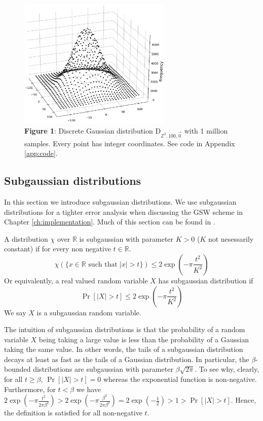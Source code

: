 \begin{figure}
    \centering
    \hypertarget{fig:discrete-gauss}{}
    \includegraphics[width=0.65\textwidth]{figures/D-G-2d-a_is_100-n_1000000.pdf}
    \caption*{\textbf{Figure 1}: Discrete Gaussian distribution $\textrm{D}_{\mathbb{Z}^2, 100, \vec{0}}$ with 1 million samples. Every point has integer coordinates. See code in Appendix \ref{app:code}.}
\end{figure}

\subsection*{Subgaussian distributions}
In this section we introduce subgaussian distributions. We use subgaussian distributions for a tighter error analysis when discussing the GSW scheme in Chapter \ref{ch:implementation}. Much of this section can be found in \cite{A-S-P-boot}.
\begin{definition}
    A distribution $\chi$ over $\mathbb{R}$ is subgaussian with parameter $K > 0$ ($K$ not nesessarily constant) if for every non negative $t \in \mathbb{R}$.
    \begin{equation*}
        \chi(\{x \in \mathbb{R} \text{ such that} \; |x| > t\}) \leq 2\exp \left(- \pi \frac{t^2}{K^2} \right)
    \end{equation*}
    Or equivalently, a real valued random variable $X$ has subgaussian distribution if
    \begin{equation*}
        \operatorname{Pr}[|X|>t] \leq 2\exp \left(- \pi \frac{t^2}{K^2} \right)
    \end{equation*}
    We say $X$ is a subgaussian random variable.
\end{definition}
The intuition of subgaussian distributions is that the probability of a random variable $X$ being taking a large value is less than the probability of a Gaussian taking the same value. In other words, the tails of a subgaussian distribution decays at least as fast as the tails of a Gaussian distribution. In particular, the $\beta$-bounded distributions are subgaussian with parameter $\beta \sqrt{2\pi}$. To see why, clearly, for all $t \geq \beta$, $\operatorname{Pr}[|X|>t] = 0$ whereas the exponential function is non-negative. Furthermore, for $t < \beta$ we have $2\exp \left(- \pi \frac{t^2}{2\pi \beta^2} \right) > 2\exp \left(- \pi \frac{\beta^2}{2\pi \beta^2}\right) = 2\exp(-\frac{1}{2}) > 1 > \operatorname{Pr}[|X|>t]$. Hence, the definition is satisfied for all non-negative $t$.

